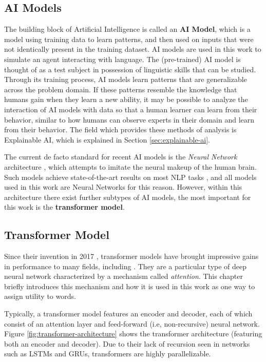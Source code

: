 \subsection{AI Models}
The building block of Artificial Intelligence is called an \textbf{AI Model}, which is a model using training data to learn patterns, and then used on inputs that were not identically present in the training dataset.
AI models are used in this work to simulate an agent interacting with language.
The (pre-trained) AI model is thought of as a test subject in possession of linguistic skills that can be studied.
Through its training process, AI models learn patterns that are generalizable across the problem domain.
If these patterns resemble the knowledge that humans gain when they learn a new ability, it may be possible to analyze the interaction of AI models with data so that a human learner can learn from their behavior, similar to how humans can observe experts in their domain and learn from their behavior.
The field which provides these methods of analysis is Explainable AI, which is explained in Section \ref{sec:explainable-ai}.

The current de facto standard for recent AI models is the \textit{Neural Network} architecture \cite{jurafskySpeechLanguageProcessing2025}, which attempts to imitate the neural makeup of the human brain.
Such models achieve state-of-the-art results on most NLP tasks \cite{jurafskySpeechLanguageProcessing2025a}, and all models used in this work are Neural Networks for this reason.
However, within this architecture there exist further subtypes of AI models, the most important for this work is the \textbf{transformer model}.


\subsection{Transformer Model} \label{sec:transformer}
Since their invention in 2017 \cite{vaswani2017attention}, transformer models have brought impressive gains in performance to many fields, including \NLP.
They are a particular type of deep neural network characterized by a mechanism called \textit{attention}.
This chapter briefly introduces this mechanism and how it is used in this work as one way to assign utility to words.

Typically, a transformer model features an encoder and decoder, each of which consist of an attention layer and feed-forward (i.e, non-recursive) neural network.
Figure \ref{fig:transformer-architecture} shows the transformer architecture (featuring both an encoder and decoder).
Due to their lack of recursion seen in networks such as LSTMs and GRUs, transformers are highly parallelizable.

